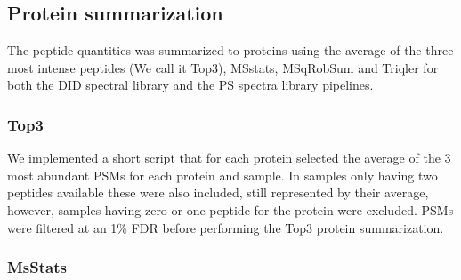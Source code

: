 \documentclass[10pt,letterpaper]{article}
\begin{document}




\subsection*{Protein summarization}

The peptide quantities was summarized to proteins using the average of the three most intense peptides (We call it Top3), MSstats, MSqRobSum and Triqler for both the DID spectral library and the PS spectra library pipelines. 

\subsubsection*{Top3}

We implemented a short script that for each protein selected the average of the 3 most abundant PSMs for each protein and sample. In samples only having two peptides available these were also included, still represented by their average, however, samples having zero or one peptide for the protein were excluded. PSMs were filtered at an 1\% FDR before performing the Top3 protein summarization. 




\subsubsection*{MsStats}
\end{document}
